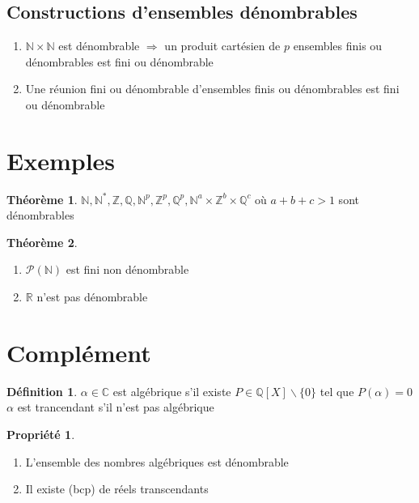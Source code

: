 \documentclass[fleqn]{article}
\theoremstyle{definition} \newtheorem*{defi}{D\'efinition}
\theoremstyle{definition} \newtheorem*{theo}{Th\'eor\`eme}
\theoremstyle{definition} \newtheorem*{coro}{Corollaire}
\theoremstyle{definition} \newtheorem*{nota}{Notation}
\theoremstyle{definition} \newtheorem*{vocab}{Vocabulaire}
\theoremstyle{remark} \newtheorem*{rqs}{Remarques}
\theoremstyle{definition} \newtheorem*{prop}{Propri\'et\'e}
\begin{document}
\subsection{Constructions d'ensembles d\'enombrables}
\begin{enumerate}
	\item $\mathbb{N} \times \mathbb{N}$ est d\'enombrable $\Rightarrow$ un produit cart\'esien de $p$ ensembles finis ou d\'enombrables est
		fini ou d\'enombrable
	\item Une r\'eunion fini ou d\'enombrable d'ensembles finis ou d\'enombrables est fini ou d\'enombrable
\end{enumerate}

\section{Exemples}
\begin{theo}
	$\mathbb{N}, \mathbb{N}^*, \mathbb{Z}, \mathbb{Q}, \mathbb{N}^p, \mathbb{Z}^p, \mathbb{Q}^p, \mathbb{N}^a\times \mathbb{Z}^b\times
	\mathbb{Q}^c$ o\`u $a+b+c>1$ sont d\'enombrables
\end{theo}

\begin{theo} $ $
	\begin{enumerate}
		\item $\mathcal{P}(\mathbb{N})$  est fini non d\'enombrable
		\item $\mathbb{R}$ n'est pas d\'enombrable
	\end{enumerate}
\end{theo}

\section{Compl\'ement}
\begin{defi}
	$\alpha \in \mathbb{C}$ est alg\'ebrique s'il existe $P \in \mathbb{Q}[X] \backslash \{0\}$ tel que $P(\alpha) = 0$ \\
	$\alpha$ est trancendant s'il n'est pas alg\'ebrique
\end{defi}

\begin{prop} $ $
	\begin{enumerate}
		\item L'ensemble des nombres alg\'ebriques est d\'enombrable
		\item Il existe (bcp) de r\'eels transcendants
	\end{enumerate}
\end{prop}
\end{document}
